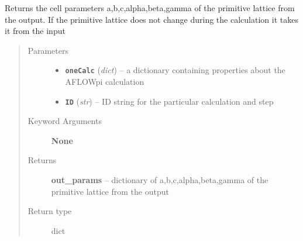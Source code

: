 \documentclass[letterpaper,10pt,english]{sphinxmanual}
\begin{document}
\begin{fulllineitems}
\label{retr:retr.__getCellOutDim}
Returns the cell parameters a,b,c,alpha,beta,gamma of the primitive lattice from the output.
If the primitive lattice does not change during the calculation it takes it from the input
\begin{quote}\begin{description}
\item[{Parameters}] \leavevmode\begin{itemize}
\item {} 
\textbf{\texttt{oneCalc}} (\emph{dict}) -- a dictionary containing properties about the AFLOWpi calculation

\item {} 
\textbf{\texttt{ID}} (\emph{str}) -- ID string for the particular calculation and step

\end{itemize}

\item[{Keyword Arguments}] \leavevmode
\textbf{None}

\item[{Returns}] \leavevmode
\textbf{out\_params} --
dictionary of a,b,c,alpha,beta,gamma of the primitive lattice from the output

\item[{Return type}] \leavevmode
dict

\end{description}\end{quote}

\end{fulllineitems}

\end{document}
